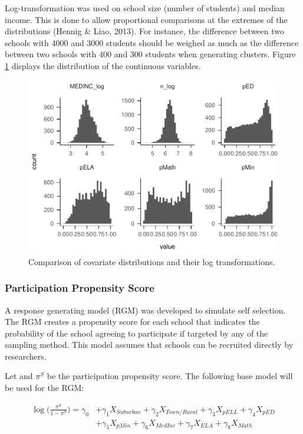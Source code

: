 \documentclass[man,floatsintext]{apa6}
\begin{document}
Log-transformation was used on school size (number of students) and median income. This is done to allow proportional comparisons at the extremes of the distributions (Hennig \& Liao, 2013). For instance, the difference between two schools with 4000 and 3000 students should be weighed as much as the difference between two schools with 400 and 300 students when generating clusters. Figure \ref{fig:plot-dist1} displays the distribution of the continuous variables.

\begin{figure}
\centering
\includegraphics{GenSamp_Paper_files/figure-latex/plot-dist1-1.pdf}
\caption{\label{fig:plot-dist1}Comparison of covariate distributions and their log transformations.}
\end{figure}

\hypertarget{participation-propensity-score}{%
\subsubsection{Participation Propensity Score}\label{participation-propensity-score}}

A response generating model (RGM) was developed to simulate self selection. The RGM creates a propensity score for each school that indicates the probability of the school agreeing to participate if targeted by any of the sampling method. This model assumes that schools can be recruited directly by researchers.

Let and \(\pi^S\) be the participation propensity score. The following base model will be used for the RGM:

\begin{align} \label{eq:sRGM}
  \log\bigg(\frac{\pi^S}{1-\pi^S}\bigg) = \gamma_{0} &+ \gamma_{1}X_{Suburban} + \gamma_{2}X_{Town/Rural} + \gamma_{3}X_{pELL} + \gamma_{4}X_{pED} 
  \\
  &+ \gamma_{5}X_{pMin} + \gamma_{6}X_{MedInc} + \gamma_{7}X_{ELA} + \gamma_{8}X_{Math} \nonumber
\end{align}
\end{document}
